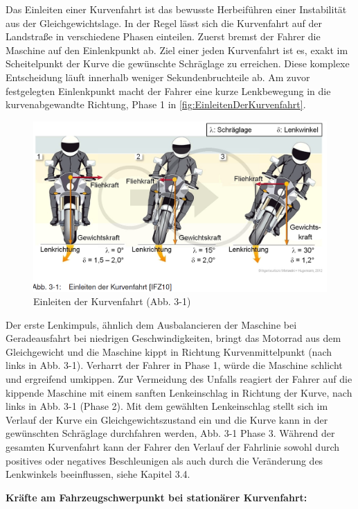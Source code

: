 Das Einleiten einer Kurvenfahrt ist das bewusste Herbeiführen einer Instabilität aus der Gleichgewichtslage. In der Regel lässt sich die Kurvenfahrt auf der Landstraße in verschiedene Phasen einteilen. Zuerst bremst der Fahrer die Maschine auf den Einlenkpunkt ab. Ziel einer jeden Kurvenfahrt ist es, exakt im Scheitelpunkt der Kurve die gewünschte Schräglage zu erreichen. Diese komplexe Entscheidung läuft innerhalb weniger Sekundenbruchteile ab. Am zuvor festgelegten Einlenkpunkt macht der Fahrer eine kurze Lenkbewegung in die kurvenabgewandte Richtung, Phase 1 in \autoref{fig:EinleitenDerKurvenfahrt}.
\begin{figure}[H]
	\centering
	\includegraphics[width=\linewidth]{Bilder/EinleitenDerKurvenfahrt.png}
	\caption{Einleiten der Kurvenfahrt (Abb. 3-1)}
	\label{fig:EinleitenDerKurvenfahrt}
\end{figure}
Der erste Lenkimpuls, ähnlich dem Ausbalancieren der Maschine bei Geradeausfahrt bei niedrigen Geschwindigkeiten, bringt das Motorrad aus dem Gleichgewicht und die Maschine kippt in Richtung Kurvenmittelpunkt (nach links in Abb. 3-1). Verharrt der Fahrer in Phase 1, würde die Maschine schlicht und ergreifend umkippen. Zur Vermeidung des Unfalls reagiert der Fahrer auf die kippende Maschine mit einem sanften Lenkeinschlag in Richtung der Kurve, nach links in Abb. 3-1 (Phase 2). Mit dem gewählten Lenkeinschlag stellt sich im Verlauf der Kurve ein Gleichgewichtszustand ein und die Kurve kann in der gewünschten Schräglage durchfahren werden, Abb. 3-1 Phase 3. Während der gesamten Kurvenfahrt kann der Fahrer den Verlauf der Fahrlinie sowohl durch positives oder negatives Beschleunigen als auch durch die Veränderung des Lenkwinkels beeinflussen,
siehe Kapitel 3.4.

\textbf{Kräfte am Fahrzeugschwerpunkt bei stationärer Kurvenfahrt:}\\

